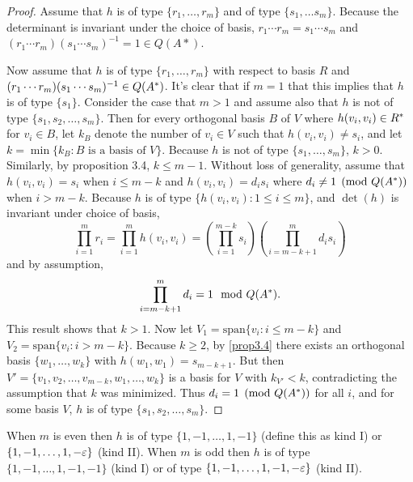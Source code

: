 \begin{proof}
Assume that $h$ is of type $\{r_1, \dotsc, r_m\}$ and of type $\{s_1, \dotsc s_m \}$. Because the determinant is invariant under the choice of basis, $r_1 \dotsb r_m = s_1 \dotsb s_m$ and $(r_1 \dotsb r_m)(s_1 \dotsb s_m)^{-1} = 1 \in Q(A*)$.

Now assume that $h$ is of type $\{r_1, \dotsc, r_m \}$ with respect to basis $R$ and $(r_1 \dotsb r_m)(s_1 \dotsb s_m)^{-1} \in Q(A^*)$.
It's clear that if $m = 1$ that this implies that $h$ is of type $\{s_1 \}$.
Consider the case that $m > 1$ and assume also that $h$ is not of type $\{s_1, s_2, \dotsc, s_m \}$.
Then for every orthogonal basis $B$ of $V$ where $h(v_i, v_i) \in R^*$ for $v_i \in B$, let $k_B$ denote the number of $v_i \in V$ such that $h(v_i, v_i) \ne s_i$, and let $k = \min \{k_B : B \text{ is a basis of } V \}$.
Because $h$ is not of type $\{s_1, \dotsc, s_m \}$, $k > 0$.
Similarly, by proposition 3.4, $k \leqslant m - 1$.
Without loss of generality, assume that $h(v_i, v_i) = s_i$ when $i \leqslant m - k$ and $h(v_i, v_i) = d_i s_i$ where $d_i \ne 1 \pmod{Q(A^*)}$ when $i > m - k$.
Because $h$ is of type $\{h(v_i,v_i): 1 \le i \le m \}$, and $\det(h)$ is invariant under choice of basis,
\[
\prod_{i=1}^m r_i = \prod_{i=1}^m h(v_i, v_i) = \left(\prod_{i=1}^{m - k} s_i \right) \left( \prod_{i=m-k+1}^m d_i s_i \right)
\]
and by assumption,
\[
\prod_{i=m-k+1}^m d_i = 1 \mod{Q(A^*)}.
\]
This result shows that $k > 1$.
Now let $V_1 = \text{span}\{v_i: i \le m - k\}$ and $V_2 = \text{span}\{v_i: i > m - k\}$.
Because $k \ge 2$, by \cref{prop3.4} there exists an orthogonal basis $\{w_1, \dotsc, w_k \}$ with $h(w_1, w_1) = s_{m - k + 1}$.
But then $V' = \{v_1, v_2, \dotsc, v_{m-k}, w_1, \dotsc, w_k \}$ is a basis for $V$ with $k_{V'} < k$, contradicting the assumption that $k$ was minimized.
Thus $d_i = 1 \pmod{Q(A^*)}$ for all $i$, and for some basis $V$, $h$ is of type $\{s_1, s_2, \dotsc, s_m\}$.
\end{proof}

\begin{lemma}\label{extralemma2}
When $m$ is even then $h$ is of type $\{1, -1, \dotsc, 1, -1 \}$ (define this as kind I) or $\{1, -1,\dotsc, 1, -\varepsilon \}$ (kind II).
When $m$ is odd then $h$ is of type $\{1, -1, \dotsc, 1, -1, -1 \}$ (kind I) or of type $\{1, -1, \dotsc, 1, -1, -\varepsilon \}$ (kind II).
\end{lemma}

